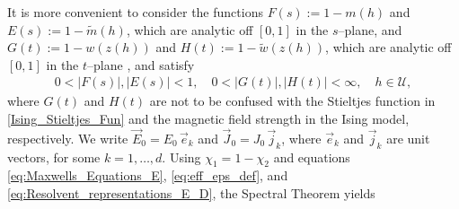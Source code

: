 \documentclass[english,12pt,jmp,graphicx]{revtex4-1}
\begin{document}
It is more convenient to consider the functions
$F(s):=1-m(h)$ and $E(s):=1-\tilde{m}(h)$, which are
analytic off $[0,1]$ in the $s$--plane, and $G(t):=1-w(z(h))$ and
$H(t):=1-\tilde{w}(z(h))$, which are analytic off $[0,1]$ in the
$t$--plane \cite{Bergman:PRC-377,Golden:CMP-473}, and satisfy
%
\begin{align}\label{eq:Stieltjes_Bounds}
  0<|F(s)|,|E(s)|<1, \quad 0<|G(t)|,|H(t)|<\infty,\quad h\in\mathcal{U},
\end{align}
%
where $G(t)$ and $H(t)$ are not to be confused with the Stieltjes
function in \eqref{Ising_Stieltjes_Fun} and the magnetic field
strength in the Ising model, respectively. We write $\vec{E}_0=E_0\,\vec{e}_k$ and
$\vec{J}_0=J_0\,\vec{j}_k$, where $\vec{e}_k$ and $\vec{j}_k$ are unit
vectors, for some $k=1,\ldots,d$. 
%
Using $\chi_1=1-\chi_2$ and equations \eqref{eq:Maxwells_Equations_E},
\eqref{eq:eff_eps_def}, and \eqref{eq:Resolvent_representations_E_D},
the Spectral Theorem \cite{Reed-1980} yields
\cite{Golden:CMP-473,Bergman:PRC-377}
\end{document}

